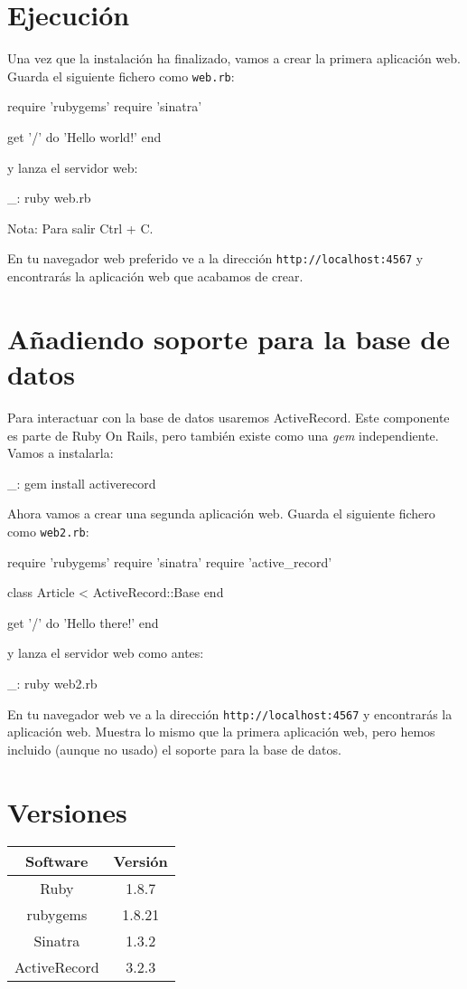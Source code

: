 \section{Ejecución}

Una vez que la instalación ha finalizado, vamos a crear la primera aplicación web. Guarda el siguiente fichero como \texttt{web.rb}:

\begin{rubycode}
require 'rubygems'
require 'sinatra'

get '/' do
  'Hello world!'
end
\end{rubycode}

y lanza el servidor web:

\begin{bashcode}
_: ruby web.rb
\end{bashcode}

Nota: Para salir Ctrl + C.

En tu navegador web preferido ve a la dirección \texttt{http://localhost:4567} y encontrarás la aplicación web que acabamos de crear.


\section{Añadiendo soporte para la base de datos}

Para interactuar con la base de datos usaremos ActiveRecord. Este componente es parte de Ruby On Rails, pero también existe como una \emph{gem} independiente. Vamos a instalarla:

\begin{bashcode}
_: gem install activerecord
\end{bashcode}

Ahora vamos a crear una segunda aplicación web. Guarda el siguiente fichero como \texttt{web2.rb}:

\begin{rubycode}
require 'rubygems'
require 'sinatra'
require 'active_record'

class Article < ActiveRecord::Base
end

get '/' do
   'Hello there!'
end
\end{rubycode}

y lanza el servidor web como antes:

\begin{bashcode}
_: ruby web2.rb
\end{bashcode}

En tu navegador web ve a la dirección \texttt{http://localhost:4567} y encontrarás la aplicación web. Muestra lo mismo que la primera aplicación web, pero hemos incluido (aunque no usado) el soporte para la base de datos.


\section{Versiones}

\begin{tabular}{|c|c|}
   \hline
   Software & Versión \\ \hline
   Ruby & 1.8.7 \\ \hline
   rubygems & 1.8.21 \\ \hline
   Sinatra & 1.3.2 \\ \hline
   ActiveRecord & 3.2.3 \\ \hline
\end{tabular}
